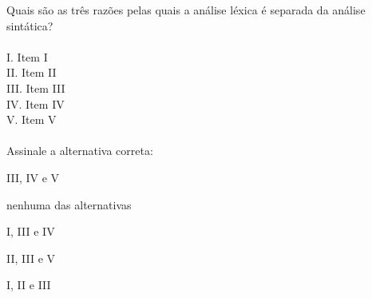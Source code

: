 \question[10]

Quais são as três razões pelas quais a análise léxica é separada da análise sintática?\\
\\
I. Item I\\
II. Item II\\
III. Item III\\
IV. Item IV\\
V. Item V\\
\\
Assinale a alternativa correta:
\begin{choices}
\item III, IV e V
\item nenhuma das alternativas
\item I, III e IV
\item II, III e V %
\item I, II e III
\end{choices}
\answerline

